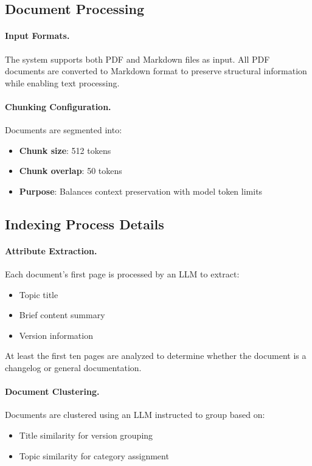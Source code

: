 \subsection{Document Processing}

\paragraph{Input Formats.}
The system supports both PDF and Markdown files as input. All PDF documents are converted to Markdown format to preserve structural information while enabling text processing.

\paragraph{Chunking Configuration.}
Documents are segmented into:
\begin{itemize}
    \item \textbf{Chunk size}: 512 tokens
    \item \textbf{Chunk overlap}: 50 tokens
    \item \textbf{Purpose}: Balances context preservation with model token limits
\end{itemize}

\subsection{Indexing Process Details}

\paragraph{Attribute Extraction.}
Each document's first page is processed by an LLM to extract:
\begin{itemize}
    \item Topic title
    \item Brief content summary
    \item Version information
\end{itemize}
At least the first ten pages are analyzed to determine whether the document is a changelog or general documentation.

\paragraph{Document Clustering.}
Documents are clustered using an LLM instructed to group based on:
\begin{itemize}
    \item Title similarity for version grouping
    \item Topic similarity for category assignment
\end{itemize}

